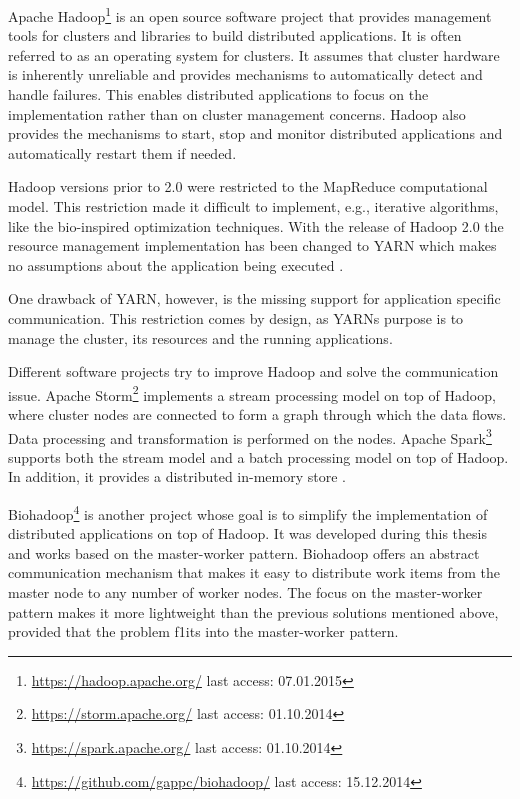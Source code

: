 Apache Hadoop\footnote{\url{https://hadoop.apache.org/} last access: 07.01.2015} is an open source software project that provides management tools for clusters and libraries to build distributed applications. It is often referred to as an operating system for clusters. It assumes that cluster hardware is inherently unreliable and provides mechanisms to automatically detect and handle failures. This enables distributed applications to focus on the implementation rather than on cluster management concerns. Hadoop also provides the mechanisms to start, stop and monitor distributed applications and automatically restart them if needed.

Hadoop versions prior to 2.0 were restricted to the MapReduce \cite{dean2008mapreduce} computational model. This restriction made it difficult to implement, e.g., iterative algorithms, like the bio-inspired optimization techniques. With the release of Hadoop 2.0 the resource management implementation has been changed to YARN \cite{vavilapalli2013apache} which makes no assumptions about the application being executed .

One drawback of YARN, however, is the missing support for application specific communication. This restriction comes by design, as YARNs purpose is to manage the cluster, its resources and the running applications.

Different software projects try to improve Hadoop and solve the communication issue. Apache Storm\footnote{\url{https://storm.apache.org/} last access: 01.10.2014} implements a stream processing model on top of Hadoop, where cluster nodes are connected to form a graph through which the data flows. Data processing and transformation is performed on the nodes. Apache Spark\footnote{\url{https://spark.apache.org/} last access: 01.10.2014} supports both the stream model and a batch processing model on top of Hadoop. In addition, it provides a distributed in-memory store \cite{zaharia2012resilient}.

Biohadoop\footnote{\url{https://github.com/gappc/biohadoop/} last access: 15.12.2014} is another project whose goal is to simplify the implementation of distributed applications on top of Hadoop. It was developed during this thesis and works based on the master-worker pattern. Biohadoop offers an abstract communication mechanism that makes it easy to distribute work items from the master node to any number of worker nodes. The focus on the master-worker pattern makes it more lightweight than the previous solutions mentioned above, provided that the problem f1its into the master-worker pattern.

